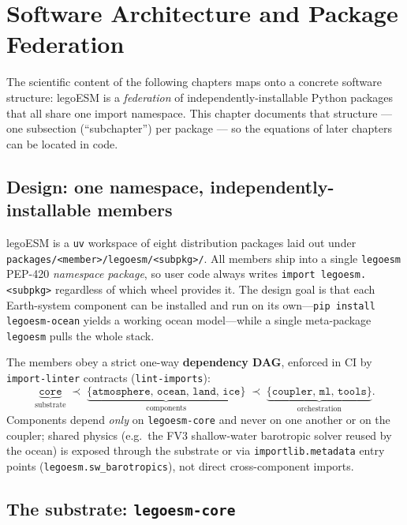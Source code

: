 \documentclass[11pt,twoside]{report}
\begin{document}
\chapter{Software Architecture and Package Federation}
\label{ch:architecture}

The scientific content of the following chapters maps onto a concrete software
structure: legoESM is a \emph{federation} of independently-installable Python
packages that all share one import namespace.  This chapter documents that
structure --- one subsection (``subchapter'') per package --- so the equations
of later chapters can be located in code.

\section{Design: one namespace, independently-installable members}
\label{sec:arch-federation}

legoESM is a \texttt{uv} workspace of eight distribution packages laid out under
\texttt{packages/<member>/legoesm/<subpkg>/}.  All members ship into a single
\texttt{legoesm} PEP-420 \emph{namespace package}, so user code always writes
\texttt{import legoesm.<subpkg>} regardless of which wheel provides it.  The
design goal is that each Earth-system component can be installed and run on its
own---\texttt{pip install legoesm-ocean} yields a working ocean model---while a
single meta-package \texttt{legoesm} pulls the whole stack.

The members obey a strict one-way \textbf{dependency DAG}, enforced in CI by
\texttt{import-linter} contracts (\texttt{lint-imports}):
\[
  \underbrace{\texttt{core}}_{\text{substrate}}
  \;\prec\;
  \underbrace{\{\texttt{atmosphere},\,\texttt{ocean},\,\texttt{land},\,\texttt{ice}\}}_{\text{components}}
  \;\prec\;
  \underbrace{\{\texttt{coupler},\,\texttt{ml},\,\texttt{tools}\}}_{\text{orchestration}}.
\]
Components depend \emph{only} on \texttt{legoesm-core} and never on one another
or on the coupler; shared physics (e.g.\ the FV3 shallow-water barotropic
solver reused by the ocean) is exposed through the substrate or via
\texttt{importlib.metadata} entry points (\texttt{legoesm.sw\_barotropics}), not
direct cross-component imports.

\section{The substrate: \texttt{legoesm-core}}
\label{sec:arch-core}
\end{document}
